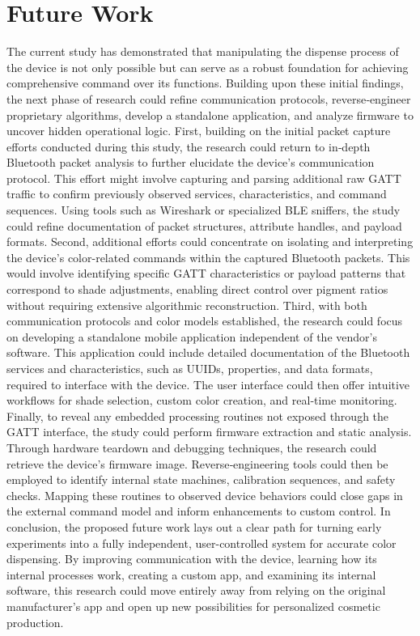 \section{Future Work}
The current study has demonstrated that manipulating the dispense process of the device is not only possible but can serve as a robust foundation for achieving comprehensive command over its functions. Building upon these initial findings, the next phase of research could refine communication protocols, reverse‑engineer proprietary algorithms, develop a standalone application, and analyze firmware to uncover hidden operational logic.
First, building on the initial packet capture efforts conducted during this study, the research could return to in‑depth Bluetooth packet analysis to further elucidate the device’s communication protocol. This effort might involve capturing and parsing additional raw GATT traffic to confirm previously observed services, characteristics, and command sequences. Using tools such as Wireshark or specialized BLE sniffers, the study could refine documentation of packet structures, attribute handles, and payload formats. 
Second, additional efforts could concentrate on isolating and interpreting the device’s color-related commands within the captured Bluetooth packets. This would involve identifying specific GATT characteristics or payload patterns that correspond to shade adjustments, enabling direct control over pigment ratios without requiring extensive algorithmic reconstruction.
Third, with both communication protocols and color models established, the research could focus on developing a standalone mobile application independent of the vendor’s software. This application could include detailed documentation of the Bluetooth services and characteristics, such as UUIDs, properties, and data formats, required to interface with the device. The user interface could then offer intuitive workflows for shade selection, custom color creation, and real‑time monitoring.
Finally, to reveal any embedded processing routines not exposed through the GATT interface, the study could perform firmware extraction and static analysis. Through hardware teardown and debugging techniques, the research could retrieve the device’s firmware image. Reverse‑engineering tools could then be employed to identify internal state machines, calibration sequences, and safety checks. Mapping these routines to observed device behaviors could close gaps in the external command model and inform enhancements to custom control.
In conclusion, the proposed future work lays out a clear path for turning early experiments into a fully independent, user-controlled system for accurate color dispensing. By improving communication with the device, learning how its internal processes work, creating a custom app, and examining its internal software, this research could move entirely away from relying on the original manufacturer’s app and open up new possibilities for personalized cosmetic production.

